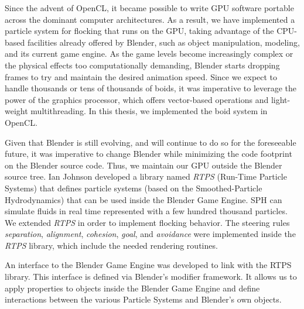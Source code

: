 Since the advent of OpenCL\cite{opencl}, it became possible to write GPU software portable across the dominant computer architectures. As a result, we have implemented a particle system for flocking that runs on the GPU, taking advantage of the CPU-based facilities already offered by Blender, such as object manipulation, modeling, and its current game engine. As the game levels  become increasingly complex or the physical effects too computationally demanding, Blender starts dropping frames to try and maintain the desired animation speed. Since we expect to handle thousands or tens of thousands of boids, it was imperative to leverage the power of the graphics processor\cite{nvidiaGPU}, which offers vector-based operations and light-weight multithreading. In this thesis, we implemented the boid system in OpenCL.



Given that Blender is still evolving, and will continue to do so for the foreseeable future, it was imperative to change Blender while minimizing the code footprint on the Blender source code. Thus, we maintain our 
GPU outside the Blender source tree. Ian Johnson\cite{ianBlog} developed a library named \textit{RTPS} (Run-Time Particle Systems) that defines particle systems (based on the Smoothed-Particle Hydrodynamics) that can be used inside the Blender Game Engine. SPH can simulate fluids in real time represented with a few hundred thousand particles. We extended \textit{RTPS} in order to implement flocking behavior. The steering rules \textit{separation}, \textit{alignment}, \textit{cohesion}, \textit{goal}, and \textit{avoidance} were implemented inside the \textit{RTPS} library, which include the needed rendering routines.



An interface to the Blender Game Engine was developed to link with the RTPS library. This interface is defined via Blender's modifier framework. It allows us to apply properties to objects inside the Blender Game Engine and define interactions between the various Particle Systems and Blender's own objects.


